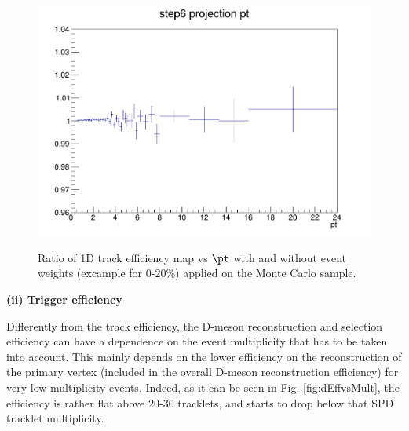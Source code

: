 \begin{figure}
\centering
{\includegraphics[width=0.7\linewidth]{figuresVsCent/Global/CrossCheck_TrackEffWeight.png}}
 \caption{Ratio of 1D track efficiency map vs $\pt$ with and without event weights (excample for 0-20\%) applied on the Monte Carlo sample.}
\label{fig:TrackEFfWeights}
\end{figure}

{\bf (ii) Trigger efficiency}

Differently from the track efficiency, the D-meson reconstruction and selection efficiency can have a dependence on the event multiplicity that has to be taken into account. This mainly depends on the lower efficiency on the reconstruction of the primary vertex (included in the overall D-meson reconstruction efficiency) for very low multiplicity events. Indeed, as it can be seen in Fig. \ref{fig:dEffvsMult}, the efficiency is rather flat above 20-30 tracklets, and starts to drop below that SPD tracklet multiplicity.

